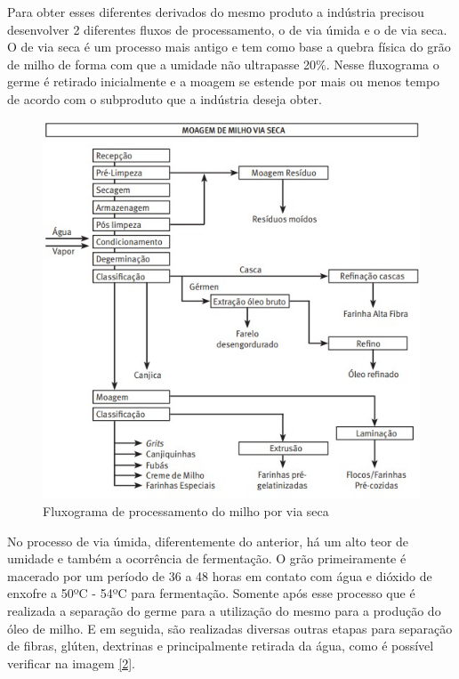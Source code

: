 \documentclass[
	12pt,				%
	openright,			%
	oneside,			%
	a4paper,			%
	english,			%
	french,				%
	spanish,			%
	brazil				%
	]{abntex2}
\begin{document}
Para obter esses diferentes derivados do mesmo produto a indústria precisou desenvolver 2 diferentes fluxos de processamento, o de via úmida e o de via seca. O de via seca é um processo mais antigo e tem como base a quebra física do grão de milho de forma com que a umidade não ultrapasse 20$\%$. Nesse fluxograma o germe é retirado inicialmente e a moagem se estende por mais ou menos tempo de acordo com o subproduto que a indústria deseja obter. \cite{strazzi2015derivados}

\begin{figure}[H]
\begin{center}
\caption{Fluxograma de processamento do milho por via seca}
\includegraphics[scale=0.55]{Imagens/WhatsApp Image 2022-10-09 at 14.41.23.jpeg} 
\end{center}
\end{figure}

No processo de via úmida, diferentemente do anterior, há um alto teor de umidade e também a ocorrência de fermentação. O grão primeiramente é macerado por um período de 36 a 48 horas em contato com água e dióxido de enxofre a 50ºC - 54ºC para fermentação. Somente após esse processo que é realizada a separação do germe para a utilização do mesmo para a produção do óleo de milho. E em seguida, são realizadas diversas outras etapas para separação de fibras, glúten, dextrinas e principalmente retirada da água, como é possível verificar na imagem \ref{2}. \cite{strazzi2015derivados}
\end{document}
